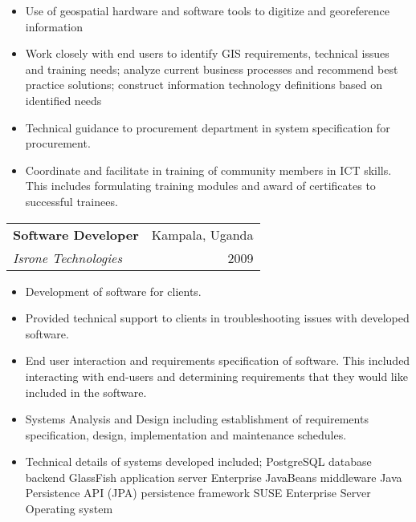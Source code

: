 \documentclass[12pt,a4paper]{article}
\begin{document}
\begin{itemize}
\item Use of geospatial hardware and software tools to digitize and georeference information
\item Work closely with end users to identify GIS requirements, technical issues and training needs; analyze current business processes and recommend best practice solutions; construct information technology definitions based on identified needs
\item Technical guidance to procurement department in system specification for procurement.
\item Coordinate and facilitate in training of community members in ICT skills. This includes formulating training modules and award of certificates to successful trainees.

\end{itemize}

\begin{tabularx}{\textwidth}{ X R }
  \textbf{Software Developer} & Kampala, Uganda\\
  \emph{Isrone Technologies} & 2009\\
\end{tabularx}
  \begin{itemize}
    \item Development of software for clients.
\item Provided technical support to clients in troubleshooting issues with developed software.
\item End user interaction and requirements specification of software. This included interacting with end-users and determining requirements that they would like included in the software.
\item Systems Analysis and Design including establishment of requirements specification, design, implementation and maintenance schedules.
\item Technical details of systems developed included;
PostgreSQL database backend
GlassFish application server
Enterprise JavaBeans middleware
Java Persistence API (JPA) persistence framework
SUSE Enterprise Server Operating system
  \end{itemize}
\end{document}
